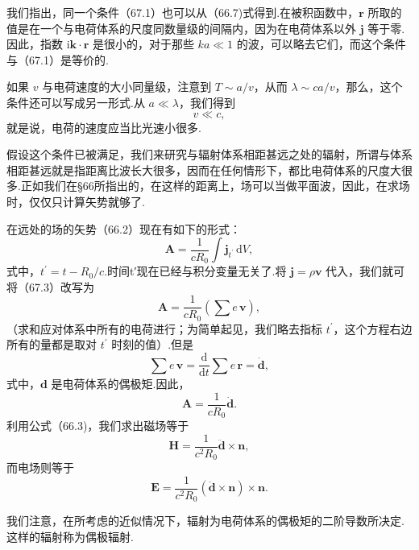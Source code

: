 我们指出，同一个条件（67.1）也可以从（66.7)式得到.在被积函数中，$\boldsymbol{r}$ 所取的值是在一个与电荷体系的尺度同数量级的间隔内，因为在电荷体系以外 $\boldsymbol{j}$ 等于零.因此，指数 $\mathrm{i}\boldsymbol{k}\cdot\boldsymbol{r}$ 是很小的，对于那些 $ka\ll 1$ 的波，可以略去它们，而这个条件与（67.1）是等价的.

如果 $v$ 与电荷速度的大小同量级，注意到 $T\sim a/v$，从而 $\lambda\sim ca/v$，那么，这个条件还可以写成另一形式.从 $a\ll\lambda$，我们得到
\begin{equation}
  v\ll c,
\end{equation}
就是说，电荷的速度应当比光速小很多.

假设这个条件已被满足，我们来研究与辐射体系相距甚远之处的辐射，所谓与体系相距甚远就是指距离比波长大很多，因而在任何情形下，都比电荷体系的尺度大很多.正如我们在§66所指出的，在这样的距离上，场可以当做平面波，因此，在求场时，仅仅只计算矢势就够了.

在远处的场的矢势（66.2）现在有如下的形式：
\begin{equation}
  \boldsymbol{A}=\frac{1}{cR_0}\int\boldsymbol{j}_{t^{\prime}}\,\mathrm{d}V,
\end{equation}
式中，$t^{\prime}=t-R_0/c$.时间t′现在已经与积分变量无关了.将 $\boldsymbol{j}=\rho\boldsymbol{v}$ 代入，我们就可将（67.3）改写为
\begin{equation*}
  \boldsymbol{A}=\frac{1}{cR_0}\left(\sum e\,\boldsymbol{v}\right),
\end{equation*}
（求和应对体系中所有的电荷进行；为简单起见，我们略去指标 $t^{\prime}$，这个方程右边所有的量都是取对 $t^{\prime}$ 时刻的值）.但是
\begin{equation*}
  \sum e\,\boldsymbol{v}=\frac{\mathrm{d}}{\mathrm{d}t}\sum e\,\boldsymbol{r}=\dot{\boldsymbol{d}},
\end{equation*}
式中，$\boldsymbol{d}$ 是电荷体系的偶极矩.因此，
\begin{equation}
  \boldsymbol{A}=\frac{1}{cR_0}\dot{\boldsymbol{d}}.
\end{equation}
利用公式（66.3)，我们求出磁场等于
\begin{equation}
  \boldsymbol{H}=\frac{1}{c^2R_0}\ddot{\boldsymbol{d}}\times\boldsymbol{n},
\end{equation}
而电场则等于
\begin{equation}
  \boldsymbol{E}=\frac{1}{c^2R_0}(\ddot{\boldsymbol{d}}\times\boldsymbol{n})\times\boldsymbol{n}.
\end{equation}

我们注意，在所考虑的近似情况下，辐射为电荷体系的偶极矩的二阶导数所决定.这样的辐射称为偶极辐射.

